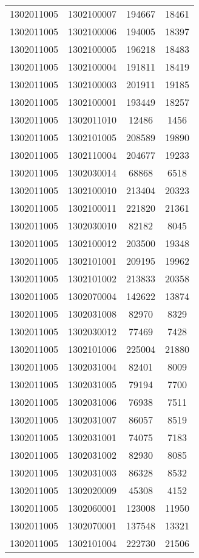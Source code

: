 \begin{longtable}[h]{llcc}
		1302011005 & 1302100007 & 194667 & 18461\\
		1302011005 & 1302100006 & 194005 & 18397\\
		1302011005 & 1302100005 & 196218 & 18483\\
		1302011005 & 1302100004 & 191811 & 18419\\
		1302011005 & 1302100003 & 201911 & 19185\\
		1302011005 & 1302100001 & 193449 & 18257\\
		1302011005 & 1302011010 & 12486 & 1456\\
		1302011005 & 1302101005 & 208589 & 19890\\
		1302011005 & 1302110004 & 204677 & 19233\\
		1302011005 & 1302030014 & 68868 & 6518\\
		1302011005 & 1302100010 & 213404 & 20323\\
		1302011005 & 1302100011 & 221820 & 21361\\
		1302011005 & 1302030010 & 82182 & 8045\\
		1302011005 & 1302100012 & 203500 & 19348\\
		1302011005 & 1302101001 & 209195 & 19962\\
		1302011005 & 1302101002 & 213833 & 20358\\
		1302011005 & 1302070004 & 142622 & 13874\\
		1302011005 & 1302031008 & 82970 & 8329\\
		1302011005 & 1302030012 & 77469 & 7428\\
		1302011005 & 1302101006 & 225004 & 21880\\
		1302011005 & 1302031004 & 82401 & 8009\\
		1302011005 & 1302031005 & 79194 & 7700\\
		1302011005 & 1302031006 & 76938 & 7511\\
		1302011005 & 1302031007 & 86057 & 8519\\
		1302011005 & 1302031001 & 74075 & 7183\\
		1302011005 & 1302031002 & 82930 & 8085\\
		1302011005 & 1302031003 & 86328 & 8532\\
		1302011005 & 1302020009 & 45308 & 4152\\
		1302011005 & 1302060001 & 123008 & 11950\\
		1302011005 & 1302070001 & 137548 & 13321\\
		1302011005 & 1302101004 & 222730 & 21506\\

\end{longtable}
